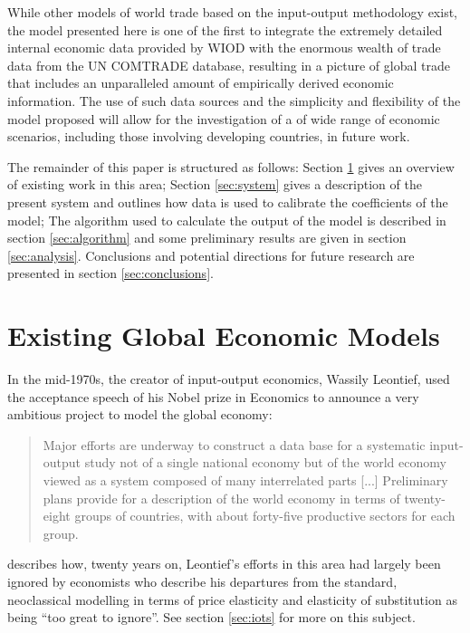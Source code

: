 \documentclass[a4paper]{article}
\begin{document}
While other models of world trade based on the input-output methodology exist, the model presented here is one of the first to integrate the extremely detailed internal economic data provided by WIOD with the enormous wealth of trade data from the UN COMTRADE database, resulting in a picture of global trade that includes an unparalleled amount of empirically derived economic information.
The use of such data sources and the simplicity and flexibility of the model proposed will allow for the investigation of a of wide range of economic scenarios, including those involving developing countries, in future work.

The remainder of this paper is structured as follows: 
Section \ref{sec:litreview} gives an overview of existing work in this area;
Section \ref{sec:system} gives a description of the present system and outlines how data is used to calibrate the coefficients of the model;
The algorithm used to calculate the output of the model is described in section \ref{sec:algorithm} and some preliminary results are given in section \ref{sec:analysis}.
Conclusions and potential directions for future research are presented in section \ref{sec:conclusions}.

\section{Existing Global Economic Models} \label{sec:litreview}
In the mid-1970s, the creator of input-output economics, Wassily Leontief, used the acceptance speech of his Nobel prize in Economics to announce a very ambitious project to model the global economy:

\begin{quotation}
Major efforts are underway to construct a data base for a systematic input-output study not of a single national economy but of the world economy viewed as a system composed of many interrelated parts [...]
Preliminary plans provide for a description of the world economy in terms of twenty-eight groups of countries, with about forty-five productive sectors for each group. 
\end{quotation}

\textcite{duchin_international_2004} describes how, twenty years on, Leontief's efforts in this area had largely been ignored by economists who describe his departures from the standard, neoclassical modelling in terms of price elasticity and elasticity of substitution as being ``too great to ignore''. 
See section \ref{sec:iots} for more on this subject.
\end{document}
